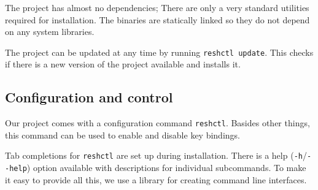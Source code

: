 The project has almost no dependencies; There are only a very standard utilities required for installation. The binaries are statically linked so they do not depend on any system libraries.

The project can be updated at any time by running \verb|reshctl update|. This checks if there is a new version of the project available and installs it.

\subsection{Configuration and control}

Our project comes with a configuration command \verb|reshctl|. Basides other things, this command can be used to enable and disable key bindings. 

Tab completions for \verb|reshctl| are set up during installation. There is a help (\verb|-h|/\verb|--help|) option available with descriptions for individual subcommands. To make it easy to provide all this, we use a library\cite{lib-go-cobra} for creating command line interfaces.
